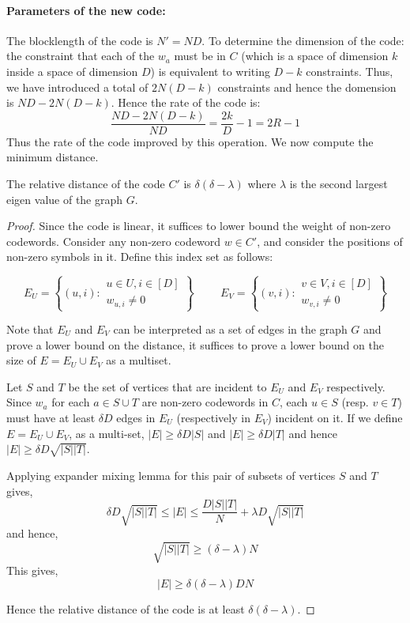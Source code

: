 \paragraph{Parameters of the new code:} 
The blocklength of the code is $N'=ND$. To determine the dimension of the code: the constraint that each of the $w_a$ must be in $C$ (which is a space of dimension $k$ inside a space of dimension $D$) is equivalent to writing $D-k$ constraints. Thus, we have introduced a total of $2N(D-k)$ constraints and hence the domension is $ND-2N(D-k)$. Hence the rate of the code is:
$$\frac{ND-2N(D-k)}{ND} = \frac{2k}{D}-1 = 2R-1$$
Thus the rate of the code improved by this operation. We now compute the minimum distance. 

\begin{lemma}
The relative distance of the code $C'$ is $\delta(\delta-\lambda)$ where $\lambda$ is the second largest eigen value of the graph $G$.
\end{lemma}
\begin{proof}
Since the code is linear, it suffices to lower bound the weight of non-zero codewords. Consider any non-zero codeword $w \in C'$, and consider the positions of non-zero symbols in it. Define this index set as follows:

$$ 
E_U = \left\{ (u,i) : 
\begin{array}{c}
u \in U, i \in [D] \\
w_{u,i} \ne 0 
\end{array}
\right\} \hspace{1cm} 
E_V = 
\left\{ (v,i) : 
\begin{array}{c}
v \in V, i \in [D] \\
w_{v,i} \ne 0 
\end{array}
\right\}
$$

Note that $E_U$ and $E_V$ can be interpreted as a set of edges in the graph $G$ and prove a lower bound on the distance, it suffices to prove a lower bound on the size of $E = E_U \cup E_V$ as a multiset.

Let $S$ and $T$ be the set of vertices that are incident to $E_U$ and $E_V$ respectively. Since $w_a$ for each $a \in S \cup T$ are non-zero codewords in $C$, each $u \in S$ (resp. $v \in T$) must have at least $\delta D$ edges in $E_U$ (respectively in $E_V$) incident on it. If we define $E = E_U \cup E_V$, as a multi-set, $|E| \ge \delta D |S|$ and $|E| \ge \delta D |T|$ and hence $|E| \ge \delta D \sqrt{|S||T|}$.

Applying expander mixing lemma for this pair of subsets of vertices $S$ and $T$ gives, 
$$\delta D \sqrt{|S||T|} \le |E| \le \frac{D|S||T|}{N} + \lambda D \sqrt{|S||T|}$$
and hence, 
$$\sqrt{|S||T|} \ge (\delta - \lambda)N$$
This gives, 
$$|E| \ge \delta(\delta-\lambda)DN$$

\noindent Hence the relative distance of the code is at least $\delta(\delta - \lambda)$.
\end{proof}

